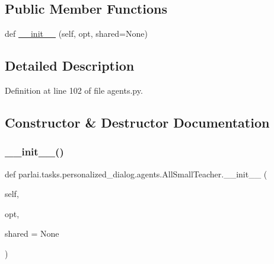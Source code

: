 \subsection*{Public Member Functions}
\begin{DoxyCompactItemize}
\item 
def \hyperlink{classparlai_1_1tasks_1_1personalized__dialog_1_1agents_1_1AllSmallTeacher_a1bb0f39431c43a72a244ae11cd3f1794}{\+\_\+\+\_\+init\+\_\+\+\_\+} (self, opt, shared=None)
\end{DoxyCompactItemize}


\subsection{Detailed Description}


Definition at line 102 of file agents.\+py.



\subsection{Constructor \& Destructor Documentation}
\mbox{\label{classparlai_1_1tasks_1_1personalized__dialog_1_1agents_1_1AllSmallTeacher_a1bb0f39431c43a72a244ae11cd3f1794}} 
\subsubsection{\texorpdfstring{\+\_\+\+\_\+init\+\_\+\+\_\+()}{\_\_init\_\_()}}
{\footnotesize\ttfamily def parlai.\+tasks.\+personalized\+\_\+dialog.\+agents.\+All\+Small\+Teacher.\+\_\+\+\_\+init\+\_\+\+\_\+ (\begin{DoxyParamCaption}\item[{}]{self,  }\item[{}]{opt,  }\item[{}]{shared = {\ttfamily None} }\end{DoxyParamCaption})}



